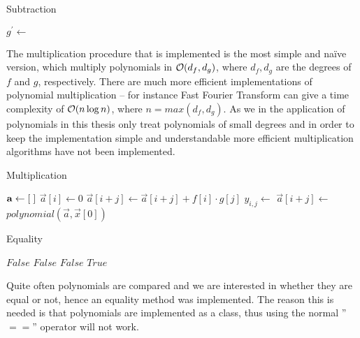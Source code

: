 \begin{algorithm}[H]
  \caption{Subtraction}
  \begin{algorithmic}[1]
      \State $g^\prime\gets$ 
      \State \Return {}
    \EndProcedure
  \end{algorithmic}
\end{algorithm}

The multiplication procedure that is implemented is the most simple and naïve version, which multiply polynomials in $\mathcal{O}(d_f,d_g)$, where $d_f,d_g$ are the degrees of $f$ and $g$, respectively. There are much more efficient implementations of polynomial multiplication -- for instance Fast Fourier Transform can give a time complexity of $\mathcal{O}(n\log n)$, where $n=max(d_f,d_g)$. As we in the application of polynomials in this thesis only treat polynomials of small degrees and in order to keep the implementation simple and understandable more efficient multiplication algorithms have not been implemented.
\begin{algorithm}[H]
  \caption{Multiplication}
  \begin{algorithmic}[1]
      \State $\mathbf{a}\gets [\hspace*{1mm}]$
        \State $\vec{a}[i]\gets 0$
      \EndFor
            \State $\vec{a}[i+j]\gets \vec{a}[i+j] + f[i]\cdot g[j]$
          \Else
            \State $y_{i,j}\gets$ 
            \State $\vec{a}[i+j]\gets$ 
          \EndIf
        \EndFor
      \EndFor
      \State \Return $polynomial(\vec{a},\vec{x}[0])$
    \EndProcedure
  \end{algorithmic}
\end{algorithm}

\begin{algorithm}[H]
  \caption{Equality}
  \begin{algorithmic}[1]
        \State \Return $False$
      \EndIf
          \State \Return $False$
          \State \Return $False$
        \EndIf
      \EndFor
      \State \Return $True$
    \EndProcedure
  \end{algorithmic}
\end{algorithm}
Quite often polynomials are compared and we are interested in whether they are equal or not, hence an equality method was implemented. The reason this is needed is that polynomials are implemented as a class, thus using the normal ''$==$'' operator will not work.

